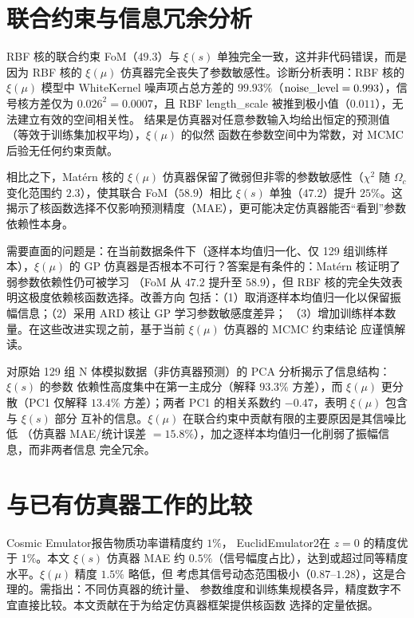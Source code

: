 \section{联合约束与信息冗余分析}\label{sec:joint-info}

RBF 核的联合约束 FoM（$49.3$）与 $\xi(s)$ 单独完全一致，这并非代码错误，而是因为 RBF 核的
$\xi(\mu)$ 仿真器完全丧失了参数敏感性。诊断分析表明：RBF 核的 $\xi(\mu)$ 模型中
WhiteKernel 噪声项占总方差的 $99.93\%$（${\rm noise\_level}=0.993$），信号核方差仅为
$0.026^{2}=0.0007$，且 RBF length\_scale 被推到极小值（$0.011$），无法建立有效的空间相关性。
结果是仿真器对任意参数输入均给出恒定的预测值（等效于训练集加权平均），$\xi(\mu)$ 的似然
函数在参数空间中为常数，对 MCMC 后验无任何约束贡献。

相比之下，Mat\'ern 核的 $\xi(\mu)$ 仿真器保留了微弱但非零的参数敏感性（$\chi^{2}$ 随
$\Omega_c$ 变化范围约 $2.3$），使其联合 FoM（$58.9$）相比 $\xi(s)$ 单独（$47.2$）提升
$25\%$。这揭示了核函数选择不仅影响预测精度（MAE），更可能决定仿真器能否``看到''参数
依赖性本身。

需要直面的问题是：在当前数据条件下（逐样本均值归一化、仅 129 组训练样本），$\xi(\mu)$ 的
GP 仿真器是否根本不可行？答案是有条件的：Mat\'ern 核证明了弱参数依赖性仍可被学习
（FoM 从 $47.2$ 提升至 $58.9$），但 RBF 核的完全失效表明这极度依赖核函数选择。改善方向
包括：（1）取消逐样本均值归一化以保留振幅信息；（2）采用 ARD 核让 GP 学习参数敏感度差异；
（3）增加训练样本数量。在这些改进实现之前，基于当前 $\xi(\mu)$ 仿真器的 MCMC 约束结论
应谨慎解读。

对原始 129 组 N 体模拟数据（非仿真器预测）的 PCA 分析揭示了信息结构：$\xi(s)$ 的参数
依赖性高度集中在第一主成分（解释 $93.3\%$ 方差），而 $\xi(\mu)$ 更分散（PC1 仅解释
$13.4\%$ 方差）；两者 PC1 的相关系数约 $-0.47$，表明 $\xi(\mu)$ 包含与 $\xi(s)$ 部分
互补的信息。$\xi(\mu)$ 在联合约束中贡献有限的主要原因是其信噪比低
（仿真器 MAE/统计误差 $=15.8\%$），加之逐样本均值归一化削弱了振幅信息，而非两者信息
完全冗余。

\section{与已有仿真器工作的比较}\label{sec:compare-prior}

Cosmic Emulator\cite{Heitmann2009}报告物质功率谱精度约 $1\%$，
EuclidEmulator2\cite{Knabenhans2019}在 $z=0$ 的精度优于 $1\%$。本文 $\xi(s)$ 仿真器 MAE
约 $0.5\%$（信号幅度占比），达到或超过同等精度水平。$\xi(\mu)$ 精度 $1.5\%$ 略低，但
考虑其信号动态范围极小（$0.87$--$1.28$），这是合理的。需指出：不同仿真器的统计量、
参数维度和训练集规模各异，精度数字不宜直接比较。本文贡献在于为给定仿真器框架提供核函数
选择的定量依据。

